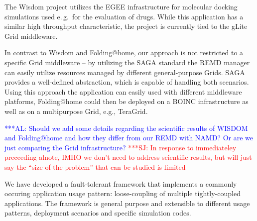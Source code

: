 \documentclass[conference,final]{IEEEtran}
\newcommand{\kimnote}[1]{ {\textcolor{green} { ***JK: #1 }}}
\newcommand{\alnote}[1]{ {\textcolor{blue} { ***AL: #1 }}}
\newcommand{\jhanote}[1]{ {\textcolor{red} { ***SJ: #1 }}}
\newcommand{\kimnote}[1]{}
\newcommand{\alnote}[1]{}
\newcommand{\jhanote}[1]{}
\newcommand{\up}{\vspace*{-1em}}
\begin{document}
The Wisdom project utilizes the EGEE infrastructure for molecular
docking simulations used e.\,g.\ for the evaluation of drugs. While this
application has a similar high throughput characteristic, the project
is currently tied to the gLite~\cite{glite2008} Grid middleware.


In contrast to Wisdom and Folding@home, our approach is not restricted
to a specific Grid middleware -- by utilizing the SAGA standard the
REMD manager can easily utilize resources managed by different
general-purpose Grids.  SAGA provides a well-defined abstraction,
which is capable of handling both scenarios. Using this approach the
application can easily used with different middleware platforms,
Folding@home could then be deployed on a BOINC infrastructure as well
as on a multipurpose Grid, e.g., TeraGrid.

\alnote{Should we add some details regarding the scientific results of
  WISDOM and Folding@home and how they differ from our REMD with NAMD?
  Or are we just comparing the Grid infrastructure?}  \jhanote{In
  response to immediateley preceeding alnote, IMHO we don't need to
  address scientific results, but will just say the ``size of the
  problem'' that can be studied is limited}

% 

\up
{}

\up We have developed a fault-tolerant framework that implements a
commonly occuring application usage pattern: loose-coupling of
multiple tightly-coupled applications. The framework is general
purpose and extensible to different usage patterns, deployment
scenarios and specific simulation codes.
\end{document}
